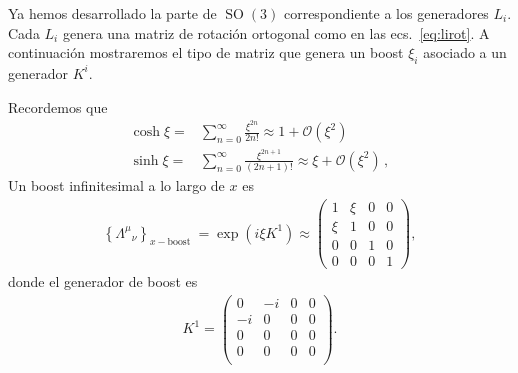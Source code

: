 \begin{frame}
Ya hemos desarrollado la parte de $\operatorname{SO}(3)$ correspondiente a los generadores $L_i$.
Cada $L_i$ genera una matriz de rotación ortogonal como en las ecs.~\eqref{eq:lirot}.
A continuación mostraremos el tipo de matriz que genera un boost $\xi_i$ asociado  a un generador $K^i$.

  Recordemos que
\begin{align}
  \cosh\xi=&\sum_{n=0}^{\infty}\frac{\xi^{2n}}{2n!}\approx 1+\mathcal{O}(\xi^2)\nonumber\\
  \sinh\xi=&\sum_{n=0}^{\infty}\frac{\xi^{2n+1}}{(2n+1)!}\approx \xi+\mathcal{O}(\xi^2)\,,
\end{align}
  Un boost infinitesimal a lo largo de $x$ es
\begin{align}
  \left\{{\Lambda^\mu}_{\nu}\right\}_{x-\text{boost }}=\exp \left( i\xi  K^1 \right)\approx
  \begin{pmatrix}
    1&\xi&0&0\\
    \xi&1&0&0\\
    0&0&1&0\\
    0&0&0&1
  \end{pmatrix},
\end{align}
donde el generador de boost es
\begin{align}
 K^1= \begin{pmatrix}
    0 & -i & 0 & 0\\
   -i & 0  & 0 & 0\\
   0 & 0 &  0 & 0\\
    0 & 0 &  0 & 0\\ 
  \end{pmatrix}.
\end{align}


\end{frame}
